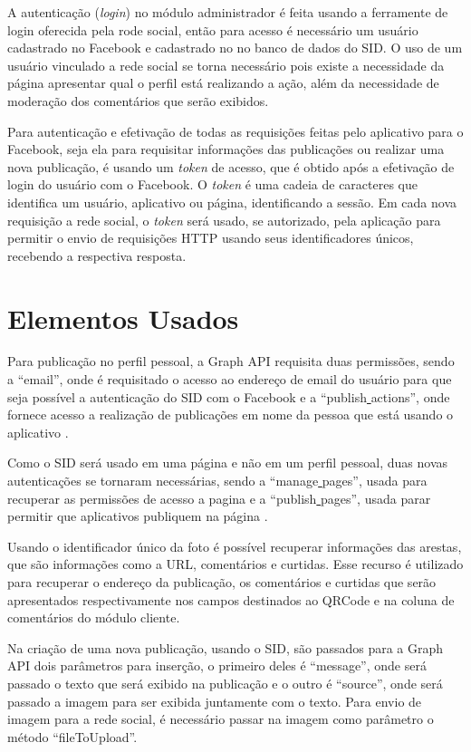 A autenticação (\textit{login}) no módulo administrador é feita usando a ferramente de login oferecida pela rode social, então para acesso é necessário um usuário cadastrado no Facebook e cadastrado no no banco de dados do SID. O uso de um usuário vinculado a rede social se torna necessário pois existe a necessidade da página apresentar qual o perfil está realizando a ação, além da necessidade de moderação dos comentários que serão exibidos. 

Para autenticação e efetivação de todas as requisições feitas pelo aplicativo para o Facebook, seja ela para requisitar informações das publicações ou realizar uma nova publicação, é usando um \textit{token} de acesso, que é obtido após a efetivação de login do usuário com o Facebook. O \textit{token} é uma cadeia de caracteres que identifica um usuário, aplicativo ou página, identificando a sessão. Em cada nova requisição a rede social, o \textit{token} será usado, se autorizado, pela aplicação para permitir o envio de requisições HTTP usando seus identificadores únicos, recebendo a respectiva resposta.

\section{Elementos Usados}
Para publicação no perfil pessoal, a Graph API requisita duas permissões, sendo a “email”, onde é requisitado o acesso ao endereço de email do usuário para que seja possível a autenticação do SID com o Facebook e a “publish\underline{{ }}actions”, onde fornece acesso a realização de publicações em nome da pessoa que está usando o aplicativo \cite{facebook2018a}.

Como o SID será usado em uma página e não em um perfil pessoal, duas novas autenticações se tornaram necessárias, sendo a “manage\underline{{ }}pages”, usada para recuperar as permissões de acesso a pagina e a “publish\underline{{ }}pages”, usada parar permitir que aplicativos publiquem na página \cite{facebook2018a}.

Usando o identificador único da foto é possível recuperar informações das arestas, que são informações como a URL, comentários e curtidas. Esse recurso é utilizado para recuperar o endereço da publicação, os comentários e curtidas que serão apresentados respectivamente nos campos destinados ao QRCode e na coluna de comentários do módulo cliente.

Na criação de uma nova publicação, usando o SID, são passados para a Graph API dois parâmetros para inserção, o primeiro deles é “message”, onde será passado o texto que será exibido na publicação e o outro é “source”, onde será passado a imagem para ser exibida juntamente com o texto. Para envio de imagem para a rede social, é necessário passar na imagem como parâmetro o método “fileToUpload”. 

